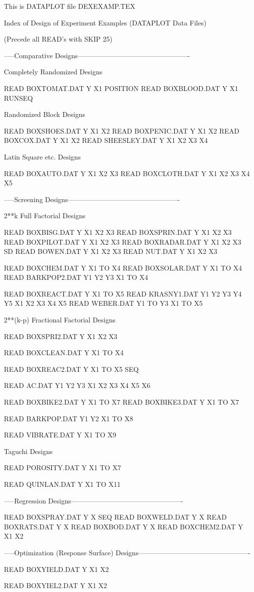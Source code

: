 This is DATAPLOT file DEXEXAMP.TEX
 
 
     Index of Design of Experiment Examples (DATAPLOT Data Files)
 
 
                   (Precede all READ's with SKIP 25)
 
 
-----Comparative Designs-------------------------------------------------
 
Completely Randomized Designs
 
   READ BOXTOMAT.DAT Y X1 POSITION
   READ BOXBLOOD.DAT Y X1 RUNSEQ
 
Randomized Block Designs
 
   READ BOXSHOES.DAT Y X1 X2
   READ BOXPENIC.DAT Y X1 X2
   READ BOXCOX.DAT Y X1 X2
   READ SHEESLEY.DAT Y X1 X2 X3 X4
 
Latin Square etc. Designs
 
   READ BOXAUTO.DAT Y X1 X2 X3
   READ BOXCLOTH.DAT Y X1 X2 X3 X4 X5
 
 
-----Screening Designs-------------------------------------------------
 
2**k Full Factorial Designs
 
   READ BOXBISG.DAT Y X1 X2 X3
   READ BOXSPRIN.DAT Y X1 X2 X3
   READ BOXPILOT.DAT Y X1 X2 X3
   READ BOXRADAR.DAT Y X1 X2 X3 SD
   READ BOWEN.DAT Y X1 X2 X3
   READ NUT.DAT Y X1 X2 X3
 
   READ BOXCHEM.DAT Y X1 TO X4
   READ BOXSOLAR.DAT Y X1 TO X4
   READ BARKPOP2.DAT Y1 Y2 Y3 X1 TO X4
 
   READ BOXREACT.DAT Y X1 TO X5
   READ KRASNY1.DAT Y1 Y2 Y3 Y4 Y5 X1 X2 X3 X4 X5
   READ WEBER.DAT Y1 TO Y3 X1 TO X5
 
2**(k-p) Fractional Factorial Designs
 
   READ BOXSPRI2.DAT Y X1 X2 X3
 
   READ BOXCLEAN.DAT Y X1 TO X4
 
   READ BOXREAC2.DAT Y X1 TO X5 SEQ
 
   READ AC.DAT Y1 Y2 Y3 X1 X2 X3 X4 X5 X6
 
   READ BOXBIKE2.DAT Y X1 TO X7
   READ BOXBIKE3.DAT Y X1 TO X7
 
   READ BARKPOP.DAT Y1 Y2 X1 TO X8
 
   READ VIBRATE.DAT Y X1 TO X9
 
Taguchi Designs
 
   READ POROSITY.DAT Y X1 TO X7
 
   READ QUINLAN.DAT Y X1 TO X11
 
 
-----Regression Designs-------------------------------------------------
 
   READ BOXSPRAY.DAT Y X SEQ
   READ BOXWELD.DAT Y X
   READ BOXRATS.DAT Y X
   READ BOXBOD.DAT Y X
   READ BOXCHEM2.DAT Y X1 X2
 
 
-----Optimization (Response Surface) Designs-------------------------------------------------
 
   READ BOXYIELD.DAT Y X1 X2
 
 
   READ BOXYIEL2.DAT Y X1 X2
 
